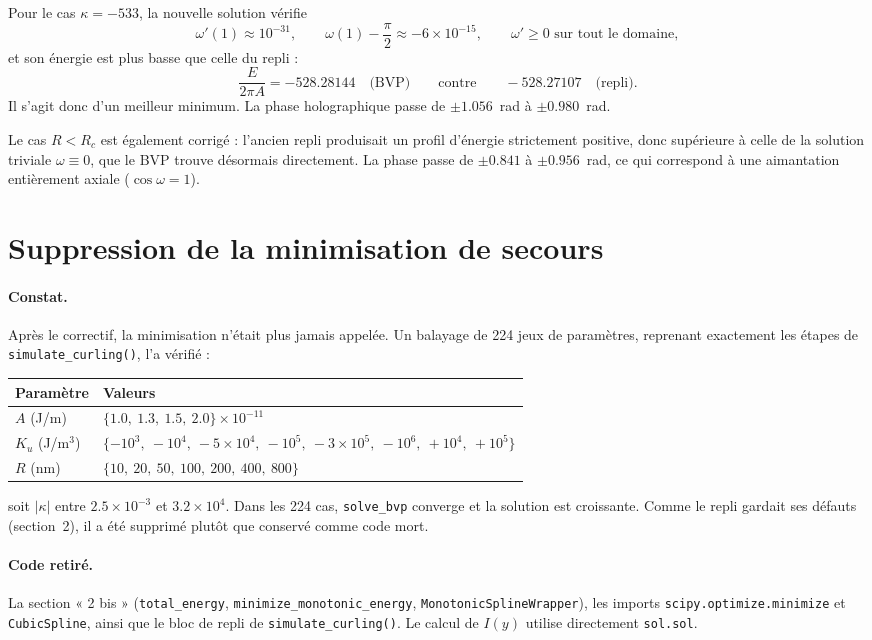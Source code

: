 \documentclass[11pt,a4paper]{article}
\begin{document}
Pour le cas $\kappa=-533$, la nouvelle solution vérifie
\[
  \omega'(1)\approx 10^{-31}, \qquad
  \omega(1)-\frac{\pi}{2}\approx -6\times10^{-15}, \qquad
  \omega' \ge 0 \text{ sur tout le domaine},
\]
et son énergie est plus basse que celle du repli :
\[
  \frac{E}{2\pi A} = -528.28144 \quad\text{(BVP)}
  \qquad\text{contre}\qquad
  -528.27107 \quad\text{(repli)} .
\]
Il s'agit donc d'un meilleur minimum. La phase holographique passe de
$\pm1.056$~rad à $\pm0.980$~rad.

Le cas $R<R_c$ est également corrigé : l'ancien repli produisait un profil
d'énergie strictement positive, donc supérieure à celle de la solution
triviale $\omega\equiv0$, que le BVP trouve désormais directement. La phase
passe de $\pm0.841$ à $\pm0.956$~rad, ce qui correspond à une aimantation
entièrement axiale ($\cos\omega = 1$).

\section{Suppression de la minimisation de secours}

\paragraph{Constat.}
Après le correctif, la minimisation n'était plus jamais appelée. Un balayage
de 224 jeux de paramètres, reprenant exactement les étapes de
\texttt{simulate\_curling()}, l'a vérifié :
\begin{center}
\begin{tabular}{@{}ll@{}}
\toprule
Paramètre & Valeurs \\
\midrule
$A$ (J/m) & $\{1.0,\ 1.3,\ 1.5,\ 2.0\}\times10^{-11}$ \\
$K_u$ (J/m$^{3}$) & $\{-10^{3},\ -10^{4},\ -5\times10^{4},\ -10^{5},\
                     -3\times10^{5},\ -10^{6},\ +10^{4},\ +10^{5}\}$ \\
$R$ (nm) & $\{10,\ 20,\ 50,\ 100,\ 200,\ 400,\ 800\}$ \\
\bottomrule
\end{tabular}
\end{center}
soit $|\kappa|$ entre $2.5\times10^{-3}$ et $3.2\times10^{4}$. Dans les 224
cas, \texttt{solve\_bvp} converge et la solution est croissante. Comme le repli
gardait ses défauts (section~2), il a été supprimé plutôt que conservé comme
code mort.

\paragraph{Code retiré.}
La section « 2 bis » (\texttt{total\_energy}, \texttt{minimize\_monotonic\_energy},
\texttt{MonotonicSplineWrapper}), les imports \texttt{scipy.optimize.minimize}
et \texttt{CubicSpline}, ainsi que le bloc de repli de
\texttt{simulate\_curling()}. Le calcul de $I(y)$ utilise directement
\texttt{sol.sol}.
\end{document}

